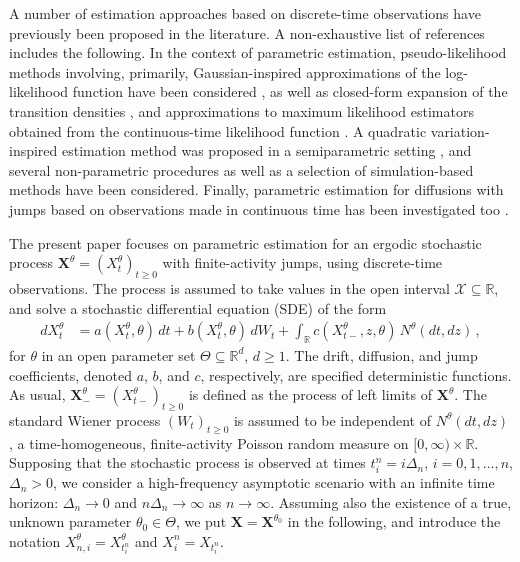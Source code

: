 \documentclass[11pt,a4paper]{article}
\newcommand{\thetan}{{\theta_0}}
\newcommand{\RR}{{\mathbb R}}
\newcommand{\X}{{\mathbf X}}
\newcommand{\xx}{{\mathcal{X}}}
\numberwithin{equation}{section}
\numberwithin{theorem}{section}
\begin{document}
A number of estimation approaches based on discrete-time observations have previously been proposed in the literature. A non-exhaustive list of references includes the following. In the context of parametric estimation, pseudo-likelihood methods involving, primarily, Gaus\-sian-in\-spi\-red approximations of the log-li\-ke\-li\-hood function have been considered \cite{shimizu2006, shimizu2006-3, ogihara2011, masuda2011, masuda2013, long2017}, as well as closed-form expansion of the transition densities \cite{yu2007, filipovic2013, li2016}, and approximations to maximum likelihood estimators obtained from the continuous-time likelihood function \cite{mai2014, gloter2018}. A quadratic variation-inspired estimation method was proposed in a semiparametric setting \cite{mancini2004}, and several non-parametric procedures \cite{bandi2003, shimizu2006-2, shimizu2008, shimizu2009, mancini2009, mancini2011, schmisser2014, wang2017, zhou2017} as well as a selection of simulation-based methods \cite{stramer2010, giesecke2017, guay2017, goncalves2017} have been considered. Finally, parametric estimation for diffusions with jumps based on observations made in continuous time has been investigated too \cite{soerensen1991}. \medskip

The present paper focuses on parametric estimation for an ergodic stochastic process $\X^\theta = (X^\theta_t)_{t\geq 0}$ with finite-activity jumps, using discrete-time observations. The process is assumed to take values in the open interval $\xx\subseteq \RR$, and solve a stochastic differential equation (SDE) of the form
%
\begin{align}
dX^\theta_t &= a(X^\theta_t, \theta)\,dt + b(X^\theta_t, \theta)\, dW_t + \int_\RR c(X^\theta_{t-}, z, \theta)\, N^\theta(dt,dz)\,,
\label{jumpSDE}
\end{align}
%
for $\theta$ in an open parameter set $\Theta\subseteq \RR^d$, $d\geq 1$. The drift, diffusion, and jump coefficients, denoted $a$, $b$, and $c$, respectively, are specified deterministic functions. As usual, $\X^\theta_- = (X^\theta_{t-})_{t\geq 0}$ is defined as the process of left limits of $\X^\theta$. The standard Wiener process $(W_t)_{t\geq 0}$ is assumed to be independent of $N^\theta(dt,dz)$, a time-homogeneous, finite-activity Poisson random measure on $[0,\infty) \times \RR$. Supposing that the stochastic process is observed at times $t_i^n = i\Delta_n$, $i=0,1,\ldots,n$, $\Delta_n > 0$, we consider a high-frequency asymptotic scenario with an infinite time horizon: $\Delta_n \to 0$ and $n\Delta_n \to \infty$ as $n\to \infty$. Assuming also the existence of a true, unknown parameter $\thetan \in \Theta$, we put $\X = \X^\thetan$ in the following, and introduce the notation $X^\theta_{n,i} = X^\theta_{t_i^n}$ and $X^n_i = X_{t_i^n}$. \medskip
\end{document}
